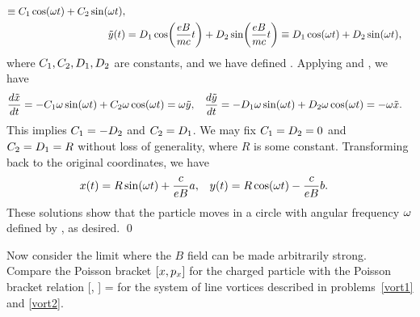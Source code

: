 \begin{solution}
\begin{align*}
		\equiv C_1 \cos(\omega t) + C_2 \sin(\omega t), \\
		\tilde{y}(t) &= D_1 \cos(\frac{e B}{m c} t) + D_2 \sin(\frac{e B}{m c} t)
		\equiv D_1 \cos(\omega t) + D_2 \sin(\omega t),
	\end{align*}
	where $C_1, C_2, D_1, D_2$ are constants, and we have defined
	\beqn \label{omg2}
		\omg \equiv {}.
	\eeqn
	Applying  and , we have
	\begin{align*}
		\dv{\tilde{x}}{t} &= -C_1 \omega \sin(\omega t) + C_2 \omega \cos(\omega t) = \omega \tilde{y}, &
		\dv{\tilde{y}}{t} &= -D_1 \omega \sin(\omega t) + D_2 \omega \cos(\omega t) = -\omega \tilde{x}.
	\end{align*}
	This implies $C_1 = -D_2$ and $C_2 = D_1$.  We may fix $C_1 = D_2 = 0$ and $C_2 = D_1 = R$ without loss of generality, where $R$ is some constant.
	Transforming back to the original coordinates, we have
	\begin{align*}
		x(t) &= R \sin(\omega t) + \frac{c}{e B} a, &
		y(t) &= R \cos(\omega t) - \frac{c}{e B} b.
	\end{align*}
	These solutions show that the particle moves in a circle with angular frequency $\omega$ defined by , as desired. \qed
\end{solution}

\begin{problem}
	Now consider the limit where the $B$ field can be made arbitrarily strong.  Compare the Poisson bracket $[x, p_x]$ for the charged particle with the Poisson bracket relation
	\beqn \label{poiss7a}
		[\xi, \yj] = 
	\eeqn
	for the system of line vortices described in problems~\ref{vort1} and \ref{vort2}.
\end{problem}


